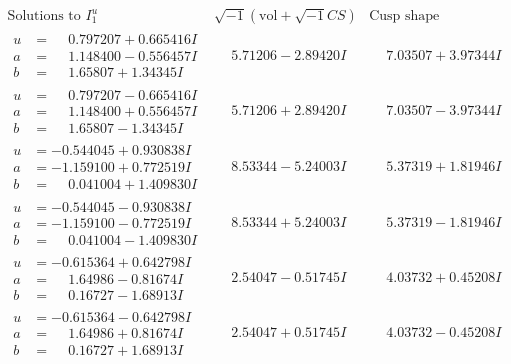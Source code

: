\documentclass[1p]{elsarticle_modified}
\theoremstyle{definition}
\newcommand{\I}{\sqrt{-1}}
\begin{document}
$$\begin{array}{c|c|c}  
\text{Solutions to }I^u_{1}& \I (\text{vol} + \sqrt{-1}CS) & \text{Cusp shape}\\
 \hline 
\begin{aligned}
u &= \phantom{-}0.797207 + 0.665416 I \\
a &= \phantom{-}1.148400 - 0.556457 I \\
b &= \phantom{-}1.65807 + 1.34345 I\end{aligned}
 & \phantom{-}5.71206 - 2.89420 I & \phantom{-}7.03507 + 3.97344 I \\ \hline\begin{aligned}
u &= \phantom{-}0.797207 - 0.665416 I \\
a &= \phantom{-}1.148400 + 0.556457 I \\
b &= \phantom{-}1.65807 - 1.34345 I\end{aligned}
 & \phantom{-}5.71206 + 2.89420 I & \phantom{-}7.03507 - 3.97344 I \\ \hline\begin{aligned}
u &= -0.544045 + 0.930838 I \\
a &= -1.159100 + 0.772519 I \\
b &= \phantom{-}0.041004 + 1.409830 I\end{aligned}
 & \phantom{-}8.53344 - 5.24003 I & \phantom{-}5.37319 + 1.81946 I \\ \hline\begin{aligned}
u &= -0.544045 - 0.930838 I \\
a &= -1.159100 - 0.772519 I \\
b &= \phantom{-}0.041004 - 1.409830 I\end{aligned}
 & \phantom{-}8.53344 + 5.24003 I & \phantom{-}5.37319 - 1.81946 I \\ \hline\begin{aligned}
u &= -0.615364 + 0.642798 I \\
a &= \phantom{-}1.64986 - 0.81674 I \\
b &= \phantom{-}0.16727 - 1.68913 I\end{aligned}
 & \phantom{-}2.54047 - 0.51745 I & \phantom{-}4.03732 + 0.45208 I \\ \hline\begin{aligned}
u &= -0.615364 - 0.642798 I \\
a &= \phantom{-}1.64986 + 0.81674 I \\
b &= \phantom{-}0.16727 + 1.68913 I\end{aligned}
 & \phantom{-}2.54047 + 0.51745 I & \phantom{-}4.03732 - 0.45208 I \\ \hline\begin{aligned}

\end{aligned}
\end{array}$$
\end{document}

